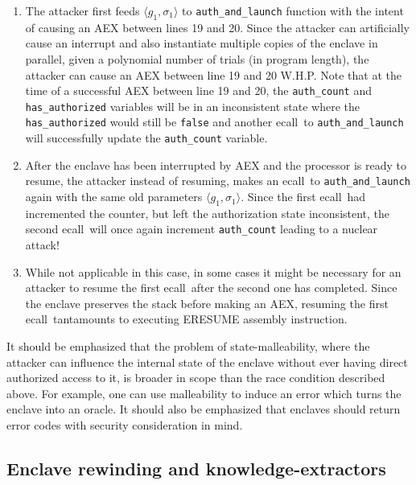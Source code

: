 \documentclass[10pt, letterpaper]{article}
\newcommand{\ecall}{\textsf{ecall}}
\begin{document}
  \begin{enumerate}
  \item The attacker first feeds $\langle g_1, \sigma_1 \rangle$ to
    \texttt{auth\_and\_launch} function with the intent of causing an
    AEX between lines 19 and 20. Since the attacker can artificially
    cause an interrupt and also instantiate multiple copies of the
    enclave in parallel, given a polynomial number of trials (in
    program length), the attacker can cause an AEX between line 19 and
    20 W.H.P. Note that at the time of a successful AEX between line
    19 and 20, the \texttt{auth\_count} and \texttt{has\_authorized}
    variables will be in an inconsistent state where the
    \texttt{has\_authorized} would still be \texttt{false} and another
    \ecall\ to \texttt{auth\_and\_launch} will successfully update the
    \texttt{auth\_count} variable.

  \item After the enclave has been interrupted by AEX and the
    processor is ready to resume, the attacker instead of resuming,
    makes an \ecall\ to \texttt{auth\_and\_launch} again with the same
    old parameters $\langle g_1, \sigma_1 \rangle$. Since the first
    \ecall\ had incremented the counter, but left the authorization
    state inconsistent, the second \ecall\ will once again increment
    \texttt{auth\_count} leading to a nuclear attack!

  \item While not applicable in this case, in some cases it might be
    necessary for an attacker to resume the first \ecall\ after the
    second one has completed. Since the enclave preserves the stack
    before making an AEX, resuming the first \ecall\ tantamounts to
    executing \textsf{ERESUME} assembly instruction.

  \end{enumerate}

  It should be emphasized that the problem of state-malleability,
  where the attacker can influence the internal state of the enclave
  without ever having direct authorized access to it, is broader in
  scope than the race condition described above. For example, one can
  use malleability to induce an error which turns the enclave into an
  oracle. It should also be emphasized that enclaves should return
  error codes with security consideration in mind.

  \subsection{Enclave rewinding and knowledge-extractors}
  \label{ssec:rewind}
\end{document}
